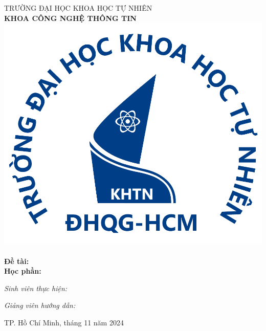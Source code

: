 \begin{titlepage}
\newcommand{\HRule}{\rule{\linewidth}{0.5mm}}


\centering


\normalsize{
\textsc{TRƯỜNG ĐẠI HỌC KHOA HỌC TỰ NHIÊN}\\
\textsc{\textbf{KHOA CÔNG NGHỆ THÔNG TIN}}\\[1.25cm]
}
\includegraphics[scale=.1]{img/Logo-TA.png}\\[1cm] 


{ 
\huge{\bfseries{\reporttitle}}\\[0.5cm]
\large{\bfseries{Đề tài: \reportname}}
}\\[0.4cm]

\textbf{\large Học phần: \coursename}\\[2.5cm]

{\normalsize
\emph{Sinh viên thực hiện:}\\
\studentname
\vspace{0.4cm}

\emph{Giảng viên hướng dẫn:} \\
\teachername
}


\vspace{4cm}

{\normalsize TP. Hồ Chí Minh, tháng 11 năm 2024}\\[3cm]


\vfill
\end{titlepage}
